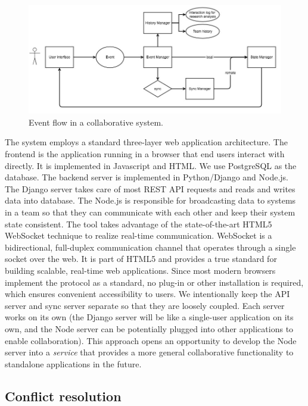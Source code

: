 \begin{figure}
	\centering
	\includegraphics[width=\columnwidth]{03-System/img/flow.jpg}
	\caption{Event flow in a collaborative system.\label{fig:flow}}
\end{figure}

The system employs a standard three-layer web application architecture. The frontend is the application running in a browser that end users interact with directly. It is implemented in Javascript and HTML. We use PostgreSQL as the database. The backend server is implemented in Python/Django and Node.js. The Django server takes care of most REST API requests and reads and writes data into database. The Node.js is responsible for broadcasting data to systems in a team so that they can communicate with each other and keep their system state consistent. 
The tool takes advantage of the state-of-the-art HTML5 WebSocket technique to
realize real-time communication. WebSocket is a bidirectional, full-duplex
communication channel that operates through a single socket over the web. It is
part of HTML5 and provides a true standard for building scalable, real-time web
applications. Since most modern browsers implement the protocol as a standard,
no plug-in or other installation is required, which ensures convenient
accessibility to users. We intentionally keep the API server and sync server separate so that they are loosely coupled. Each server works on its own (the Django server will be like a single-user application on its own, and the Node server can be potentially plugged into other applications to enable collaboration). This approach opens an opportunity to develop the Node server into a \emph{service} that provides a more general collaborative functionality to standalone applications in the future. 

\subsection{Conflict resolution}


